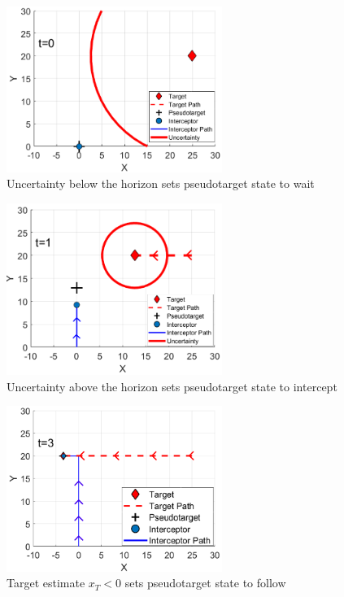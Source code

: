 \documentclass[conference]{IEEEtran}
\providecommand{\DIFdelend}{} %
\DeclareRobustCommand{\DIFdelend}{\DIFOaddend \let\includegraphics\DIFOincludegraphics} %
\begin{document}



\DIFdelend \begin{figure}[H]
	\centering
	\includegraphics[width=7cm]{wait}
	\caption{Uncertainty below the horizon sets pseudotarget state to wait}
	\label{fig:wait}
\end{figure}

\begin{figure}[H]
	\centering
	\includegraphics[width=7cm]{intercept}
	\caption{Uncertainty above the horizon sets pseudotarget state to intercept}
	\label{fig:intercept}
\end{figure}

\begin{figure}[H]
	\centering
	\includegraphics[width=7cm]{follow}
	\caption{Target estimate $x_T < 0$ sets pseudotarget state to follow}
	\label{fig:follow}
\end{figure}
\end{document}
